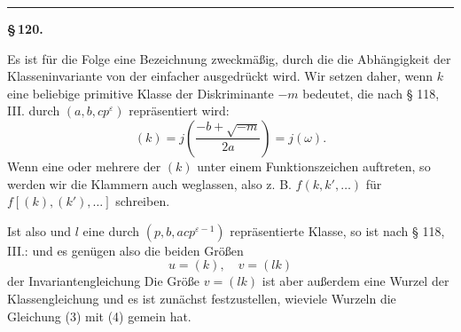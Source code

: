 
\begin{center}

\end{center}

\begin{center}\rule{0.18\linewidth}{0.4pt}\end{center}

\begin{center}
\textbf{\S\,120. }
\end{center}

Es ist für die Folge eine Bezeichnung zweckmäßig, durch
die die Abhängigkeit der Klasseninvariante von der 
einfacher ausgedrückt wird. Wir setzen daher, wenn $k$ eine beliebige
 primitive Klasse der Diskriminante $-m$ bedeutet, die
nach § 118, III. durch $(a, b, c p^{\varepsilon})$ repräsentiert wird:
\[
(k) = j\left(\frac{-b + \sqrt{-m}}{2a}\right) = j(\omega).
\]
Wenn eine oder mehrere der $(k)$ unter einem Funktionszeichen
 auftreten, so werden wir die Klammern auch weglassen,
also z. B. $f(k, k', \ldots)$ für $f[(k), (k'), \ldots]$ schreiben.

Ist also
und $l$ eine durch $(p, b, a c p^{\varepsilon-1})$ repräsentierte Klasse, so ist nach
§ 118, III.:
und es genügen also die beiden Größen
\[
u = (k), \quad v = (lk)
\]
der Invariantengleichung
Die Größe $v = (lk)$ ist aber außerdem eine Wurzel der
Klassengleichung
und es ist zunächst festzustellen, wieviele Wurzeln die Gleichung
(3) mit (4) gemein hat.
